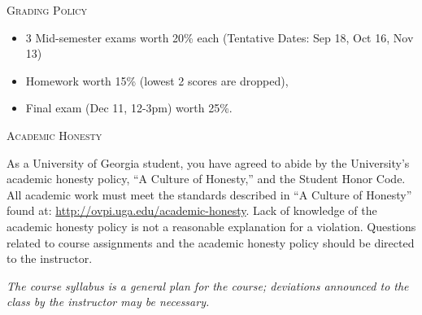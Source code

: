 \documentclass[12pt]{amsart}
\begin{document}
\medskip

\noindent
\textsc{Grading Policy}

\begin{itemize}
\item
3 Mid-semester exams worth 20\% each (Tentative Dates: Sep 18, Oct 16, Nov
13)
\item
Homework worth 15\% (lowest 2
scores are dropped), 
\item
Final exam (Dec 11, 12-3pm) worth 25\%.
\end{itemize}

\medskip

\noindent
\textsc{Academic Honesty}

As a University of Georgia student, you have agreed to abide by the
University’s academic honesty policy, “A Culture of Honesty,” and the
Student Honor Code.  All academic work must meet the standards described in
“A Culture of Honesty” found at:
\url{http://ovpi.uga.edu/academic-honesty}.  Lack of knowledge of the
academic honesty policy is not a reasonable explanation for a violation.
Questions related to course assignments and the academic honesty policy
should be directed to the instructor.



\smallskip

\textit{The course syllabus is a general plan for the course; deviations
announced to the class by 
the instructor may be necessary.}
\end{document}
